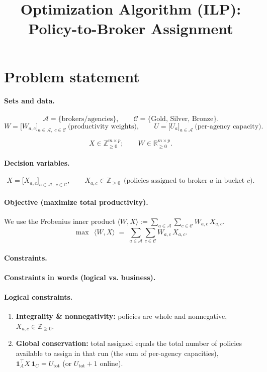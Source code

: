 \documentclass[11pt]{article}
\title{Optimization Algorithm (ILP): Policy-to-Broker Assignment}
\author{}
\date{}
\newcommand{\A}{\mathcal{A}}                 %
\newcommand{\C}{\mathcal{C}}                 %
\newcommand{\Z}{\mathbb{Z}}
\begin{document}
\maketitle

\section{Problem statement}

\paragraph{Sets and data.}
\[
\A=\{\text{brokers/agencies}\},\qquad
\C=\{\text{Gold},\,\text{Silver},\,\text{Bronze}\}.
\]
\[
W=\big[W_{a,c}\big]_{a\in\A,\;c\in\C}\ \text{(productivity weights)},\qquad
U=\big[U_a\big]_{a\in\A}\ \text{(per-agency capacity)}.
\]

\[
X \in \mathbb{Z}_{\ge 0}^{m\times p};\qquad
W \in \mathbb{R}_{\ge 0}^{m\times p}.
\]


\paragraph{Decision variables.}
\[
X=\big[X_{a,c}\big]_{a\in\A,\;c\in\C},\qquad
X_{a,c}\in \Z_{\ge 0}\ \ \text{(policies assigned to broker $a$ in bucket $c$)}.
\]

\paragraph{Objective (maximize total productivity).}
\noindent We use the Frobenius inner product $\langle W,X\rangle := \sum_{a\in\A}\sum_{c\in\C} W_{a,c}\,X_{a,c}$.
\begin{equation*}
\max\ \ \langle W,X\rangle
\;=\;
\sum_{a\in\A}\sum_{c\in\C} W_{a,c}\,X_{a,c}.
\end{equation*}

\paragraph{Constraints.}
\paragraph{Constraints in words (logical vs. business).}
\paragraph{Logical constraints.}
\begin{enumerate}[leftmargin=*]
\item \textbf{Integrality \& nonnegativity:} policies are whole and nonnegative,
$X_{a,c}\in\Z_{\ge 0}$.
\item \textbf{Global conservation:} total assigned equals the total number of policies
available to assign in that run (the sum of per-agency capacities),
$\mathbf{1}_A^\top X\,\mathbf{1}_C=U_{\mathrm{tot}}$ (or $U_{\mathrm{tot}}+1$ online).
\end{enumerate}
\end{document}
